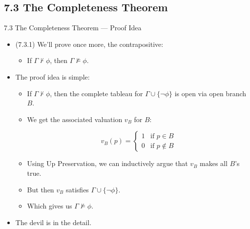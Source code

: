 \subsection{7.3 The Completeness Theorem}

\begin{frame}{7.3 The Completeness Theorem --- Proof Idea}


	\begin{itemize}
	
		\item (7.3.1) We'll prove once more, the contrapositive:
		
		\begin{itemize}
		
			\item If $\Gamma\nvdash\phi$, then $\Gamma\nvDash\phi$.
		
		\end{itemize}
		
		\item The proof idea is simple:
		
			\begin{itemize}
			
				\item If $\Gamma\nvdash\phi$, then the complete tableau for $\Gamma\cup\{\neg\phi\}$ is open via open branch $B$.
				
				\item We get the associated valuation $v_B$ for $B$:
				
				\[v_B(p)=\begin{cases} 1 &\text{if }p\in B\\0&\text{if }p\notin B\end{cases}\]
 
				
				\item Using Up Preservation, we can inductively argue that $v_B$ makes all $B$'s true.
				
				\item But then $v_B$ satisfies  $\Gamma\cup\{\neg\phi\}$.
				
				\item Which gives us $\Gamma\nvDash\phi$. 
			
			\end{itemize}
	
		\item The devil is in the detail.
	
	\end{itemize}	

\end{frame}

